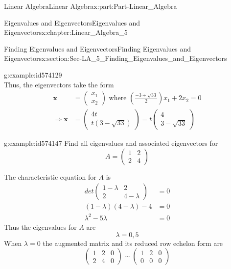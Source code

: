 \documentclass[oneside,10pt,]{book}
\numberwithin{equation}{section}
\newcommand{\amp}{&}
\begin{document}
\begin{partptx}{Linear Algebra}{}{Linear Algebra}{}{}{x:part:Part-Linear_Algebra}
\begin{chapterptx}{Eigenvalues and Eigenvectors}{}{Eigenvalues and Eigenvectors}{}{}{x:chapter:Linear_Algebra_5}
\begin{sectionptx}{Finding Eigenvalues and Eigenvectors}{}{Finding Eigenvalues and Eigenvectors}{}{}{x:section:Sec-LA_5_Finding_Eigenvalues_and_Eigenvectors}
\begin{example}{}{g:example:id574129}
\begin{equation*}
\end{equation*}
Thus, the eigenvectors take the form%
\begin{align*}
\mathbf{x} \amp =\begin{pmatrix} x_1 \\ x_2 \end{pmatrix} \textrm{ where } \left(\frac{-3+\sqrt{33}}{2}\right)x_1+2x_2=0 \\
\Rightarrow \mathbf{x} \amp =\begin{pmatrix} 4t \\ t(3-\sqrt{33}) \end{pmatrix} = t\begin{pmatrix} 4 \\ 3-\sqrt{33} \end{pmatrix}
\end{align*}
%
\end{example}
\begin{example}{}{g:example:id574147}%
Find all eigenvalues and associated eigenvectors for%
\begin{equation*}
A=\begin{pmatrix} 1 \amp 2 \\ 2 \amp 4 \end{pmatrix} 
\end{equation*}
%
\par\smallskip%
\noindent\hypertarget{g:solution:id574201}{}The characteristic equation for \(A\) is%
\begin{align*}
det\begin{pmatrix} 1-\lambda \amp 2 \\ 2\amp 4-\lambda \end{pmatrix} \amp =0\\
(1-\lambda)(4-\lambda)-4 \amp =0\\
\lambda^2-5\lambda \amp =0
\end{align*}
Thus the eigenvalues for \(A\) are%
\begin{equation*}
\lambda=0, 5
\end{equation*}
When \(\lambda=0\) the augmented matrix and its reduced row echelon form are%
\begin{equation*}
\begin{pmatrix} 1 \amp 2 \amp 0 \\ 2 \amp 4 \amp 0 \end{pmatrix} \sim \begin{pmatrix} 1 \amp 2 \amp 0 \\ 0 \amp 0 \amp 0 \end{pmatrix} 

\end{equation*}
\end{example}
\end{sectionptx}
\end{chapterptx}
\end{partptx}
\end{document}
